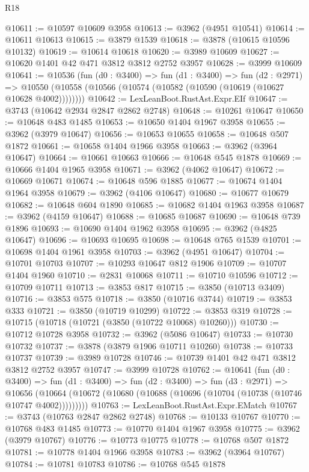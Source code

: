 \begin{lexlean}{R18}
\begin{coremodule}
@10611 := @10597 @10609 @3958
@10613 := @3962 (@4951 @10541)
@10614 := @10611 @10613
@10615 := @3879 @1539
@10618 := @3878 (@10615 @10596 @10132)
@10619 := @10614 @10618
@10620 := @3989 @10609
@10627 := @10620 @1401 @42 @471 @3812 @3812 @2752 @3957
@10628 := @3999 @10609
@10641 := @10536
    (fun (d0 : @3400) =>
    fun (d1 : @3400) =>
    fun (d2 : @2971) =>
    @10550 (@10558 (@10566 (@10574 (@10582 (@10590 (@10619 (@10627 @10628 @4002))))))))
@10642 := LexLeanBoot.RustAst.Expr.EIf
@10647 := @3743 (@10642 @2934 @2847 @2862 @2748)
@10648 := @10261 @10647
@10650 := @10648 @483 @1485
@10653 := @10650 @1404 @1967 @3958
@10655 := @3962 (@3979 @10647)
@10656 := @10653 @10655
@10658 := @10648 @507 @1872
@10661 := @10658 @1404 @1966 @3958
@10663 := @3962 (@3964 @10647)
@10664 := @10661 @10663
@10666 := @10648 @545 @1878
@10669 := @10666 @1404 @1965 @3958
@10671 := @3962 (@4062 @10647)
@10672 := @10669 @10671
@10674 := @10648 @596 @1885
@10677 := @10674 @1404 @1964 @3958
@10679 := @3962 (@4106 @10647)
@10680 := @10677 @10679
@10682 := @10648 @604 @1890
@10685 := @10682 @1404 @1963 @3958
@10687 := @3962 (@4159 @10647)
@10688 := @10685 @10687
@10690 := @10648 @739 @1896
@10693 := @10690 @1404 @1962 @3958
@10695 := @3962 (@4825 @10647)
@10696 := @10693 @10695
@10698 := @10648 @765 @1539
@10701 := @10698 @1404 @1961 @3958
@10703 := @3962 (@4951 @10647)
@10704 := @10701 @10703
@10707 := @10293 @10647 @812 @1906
@10709 := @10707 @1404 @1960
@10710 := @2831 @10068
@10711 := @10710 @10596
@10712 := @10709 @10711
@10713 := @3853 @817
@10715 := @3850 (@10713 @3409)
@10716 := @3853 @575
@10718 := @3850 (@10716 @3744)
@10719 := @3853 @333
@10721 := @3850 (@10719 @10299)
@10722 := @3853 @319
@10728 := @10715 (@10718 (@10721 (@3850 (@10722 @10068) @10260)))
@10730 := @10712 @10728 @3958
@10732 := @3962 (@5086 @10647)
@10733 := @10730 @10732
@10737 := @3878 (@3879 @1906 @10711 @10260)
@10738 := @10733 @10737
@10739 := @3989 @10728
@10746 := @10739 @1401 @42 @471 @3812 @3812 @2752 @3957
@10747 := @3999 @10728
@10762 := @10641
    (fun (d0 : @3400) =>
    fun (d1 : @3400) =>
    fun (d2 : @3400) =>
    fun (d3 : @2971) =>
    @10656 (@10664 (@10672 (@10680 (@10688 (@10696 (@10704 (@10738 (@10746 @10747 @4002)))))))))
@10763 := LexLeanBoot.RustAst.Expr.EMatch
@10767 := @3743 (@10763 @2847 @2862 @2748)
@10768 := @10133 @10767
@10770 := @10768 @483 @1485
@10773 := @10770 @1404 @1967 @3958
@10775 := @3962 (@3979 @10767)
@10776 := @10773 @10775
@10778 := @10768 @507 @1872
@10781 := @10778 @1404 @1966 @3958
@10783 := @3962 (@3964 @10767)
@10784 := @10781 @10783
@10786 := @10768 @545 @1878

\end{coremodule}
\end{lexlean}
